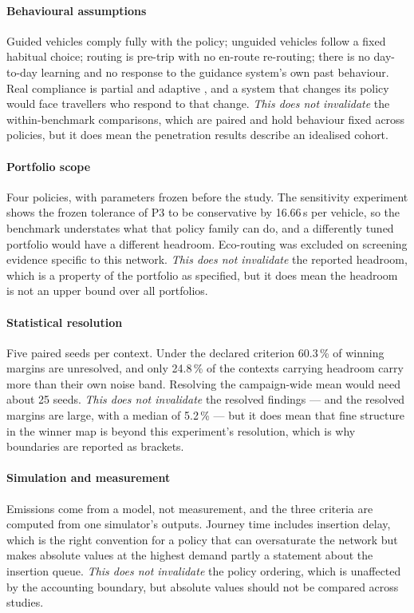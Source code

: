 \documentclass[preprint,12pt]{elsarticle}
\begin{document}
\paragraph{Behavioural assumptions} Guided vehicles comply fully with the policy;
unguided vehicles follow a fixed habitual choice; routing is pre-trip with no
en-route re-routing; there is no day-to-day learning and no response to the
guidance system's own past behaviour. Real compliance is partial and
adaptive \citep{toso2024detrimental}, and a system that changes its policy would
face travellers who respond to that change. \emph{This does not invalidate} the
within-benchmark comparisons, which are paired and hold behaviour fixed across
policies, but it does mean the penetration results describe an idealised cohort.

\paragraph{Portfolio scope} Four policies, with parameters frozen before the
study. The sensitivity experiment shows the frozen tolerance of P3 to be
conservative by 16.66\,s per vehicle, so the benchmark understates what that
policy family can do, and a differently tuned portfolio would have a different
headroom. Eco-routing was excluded on screening evidence specific to this network.
\emph{This does not invalidate} the reported headroom, which is a property of the
portfolio as specified, but it does mean the headroom is not an upper bound over
all portfolios.

\paragraph{Statistical resolution} Five paired seeds per context. Under the
declared criterion 60.3\,\% of winning margins are unresolved, and only 24.8\,\% of
the contexts carrying headroom carry more than their own noise band. Resolving the
campaign-wide mean would need about 25 seeds. \emph{This does not invalidate} the
resolved findings --- and the resolved margins are large, with a median of 5.2\,\%
--- but it does mean that fine structure in the winner map is beyond this
experiment's resolution, which is why boundaries are reported as brackets.

\paragraph{Simulation and measurement} Emissions come from a model, not
measurement, and the three criteria are computed from one simulator's outputs.
Journey time includes insertion delay, which is the right convention for a policy
that can oversaturate the network but makes absolute values at the highest demand
partly a statement about the insertion queue. \emph{This does not invalidate} the
policy ordering, which is unaffected by the accounting boundary, but absolute
values should not be compared across studies.
\end{document}
